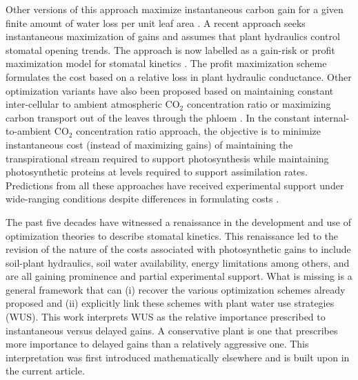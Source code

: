 \documentclass[utf8]{frontiersSCNS} %
\begin{document}
Other versions of this approach maximize instantaneous carbon gain for a given finite amount of water loss per unit leaf area \citep{katul_leaf_2009}.  A recent approach seeks instantaneous maximization of gains and assumes that plant hydraulics control stomatal opening trends.  The approach is now labelled as a gain-risk or profit maximization model for stomatal kinetics \citep{sperry_pragmatic_2016,sperry_predicting_2017}. The profit maximization scheme formulates the cost based on a relative loss in plant hydraulic conductance.  Other optimization variants have also been proposed based on maintaining constant inter-cellular to ambient atmospheric CO$_2$ concentration ratio \citep{prentice2014balancing} or maximizing carbon transport out of the leaves through the phloem \citep{nikinmaa_assimilate_2013}.  In the constant internal-to-ambient CO$_2$ concentration ratio approach, the objective is to minimize instantaneous cost (instead of maximizing gains) of maintaining the transpirational stream required to support photosynthesis while maintaining photosynthetic proteins at levels required to support assimilation rates.  Predictions from all these approaches have received experimental support under wide-ranging conditions despite differences in formulating costs  \citep{nikinmaa_assimilate_2013,prentice2014balancing,sperry_predicting_2017}.

The past five decades have witnessed a renaissance in the development and use of optimization theories to describe stomatal kinetics. This renaissance led to the revision of the nature of the costs associated with photosynthetic gains to include soil-plant hydraulics, soil water availability, energy limitations \citep{roth2018fossil} among others, and are all gaining prominence and partial experimental support. What is missing is a general framework that can (i) recover the various optimization schemes already proposed and (ii) explicitly link these schemes with plant water use strategies (WUS). This work interprets WUS as the relative importance prescribed to instantaneous versus delayed gains. A conservative plant is one that prescribes more importance to delayed gains than a relatively aggressive one. This interpretation was first introduced mathematically elsewhere \citep{manzoni_optimization_2013} and is built upon in the current article.
\end{document}
